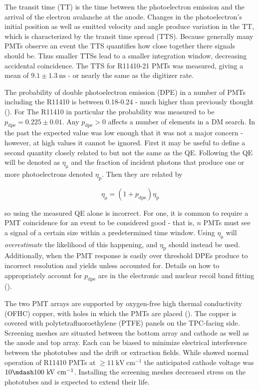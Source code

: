 The transit time (TT) is the time between the photoelectron emission and the arrival of the electron avalanche at the anode.  Changes in
the photoelectron's initial position as well as emitted velocity and angle produce variation in the TT, which is characterized by the
transit time spread (TTS).  Because generally many PMTs observe an event the TTS quantifies how close together there signals should
be.  Thus
smaller TTSs lead to a smaller integration window, decreasing accidental coincidence.  The TTS for R11410-21 PMTs was measured, giving
a mean of $9.1 \pm 1.3\ \mathrm{ns}$ - or nearly the same as the digitizer rate.

The probability of double photoelectron emission (DPE) in a number of PMTs including the R11410 is between 0.18-0.24 - much higher
than previously thought ().  For The R11410 in particular the probability was measured to be
$p_{\mathrm{dpe}} = 0.225 \pm 0.01$.  Any $p_{\mathrm{dpe}} > 0$ affects a number of elements in a DM
search.  In the past the expected value was low enough that it was not a major concern - however, at high values it cannot be
ignored.  First it may be useful to define a second quantity closely
related to but not the same as the QE.  Following  the QE will be denoted as $\eta_{\mathrm{\mu}}$ and the fraction of
incident photons that produce one or more photoelectrons denoted $\eta_{\mathrm{p}}$.  Then they are related by

\begin{equation}
\eta_{\mathrm{\mu}} = (1 + p_{\mathrm{dpe}}) \eta_{\mathrm{p}}
\label{eq:xenon1t_pmts_dpe}
\end{equation}

\noindent so using the measured QE alone is incorrect.  For one, it is common to require a PMT coincidence for an event to
be considered good - that is, $n$ PMTs must see a signal of a certain size within a predetermined time window.  Using
$\eta_{\mathrm{\mu}}$ will
\textit{overestimate} the likelihood of this happening, and $\eta_{\mathrm{p}}$ should instead be used.  Additionally, when the PMT
response is easily over threshold DPEs produce to incorrect resolution and yields unless accounted for.  Details on how to appropriately
account for $p_{\mathrm{dpe}}$ are in the electronic and nuclear recoil band fitting
().

The two PMT arrays are supported by oxygen-free high thermal conductivity (OFHC) copper, with holes in which the PMTs are placed
().  The
copper is covered with polytetrafluoroethylene (PTFE) panels on the TPC-facing side.  Screening meshes are situated between the bottom
array and cathode as well as the anode and top array.  Each can be biased to minimize electrical interference between the
phototubes and the drift or extraction fields.  While  showed normal operation of R11410 PMTs at
$\geq 11\ \mathrm{kV\ cm^{-1}}$ the anticipated cathode voltage was $10 \mdash 100\ \mathrm{kV\ cm^{-1}}$.  Installing the screening
meshes decreased stress on the phototubes and is expected to extend their life.

